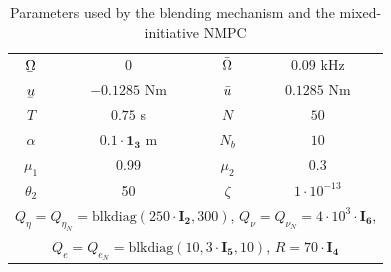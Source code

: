 \begin{table}[h]
\caption{Parameters used by the blending mechanism and the mixed-initiative NMPC}
\centering
\begin{tabular}{cc|cc}
\toprule
$\ubar{\Omega}$ & $0$ & $\Bar{\Omega}$ & $0.09$ kHz \\
$\ubar{u}$ & $-0.1285$ Nm &  $\Bar{u}$ & $0.1285$ Nm \\
$T$ & $0.75$ s & $N$ & $50$ \\
$\alpha$ & $0.1{\cdot}\mathbf{1_3}$ m  & $N_b$ & $10$ \\
$\mu_1$ & 0.99 & $\mu_2$ & 0.3\\
$\theta_2$ & 50 & $\zeta$ & $1{\cdot}10^{-13}$\\
\midrule
\multicolumn{4}{c}{$Q_{\eta} = Q_{\eta_N} = \text{blkdiag}(250{\cdot}\mathbf{I_2}, 300)$, $Q_{\nu} = Q_{\nu_N} = 4{\cdot}10^3{\cdot}\mathbf{I_6}$,}\\
\multicolumn{4}{c}{$Q_{e} = Q_{e_N} = \text{blkdiag}(10, 3{\cdot}\mathbf{I_5}, 10)$, $R = 70{\cdot}\mathbf{I_4}$}\\
\bottomrule
\end{tabular}\label{tab:scenario1}
\end{table}
